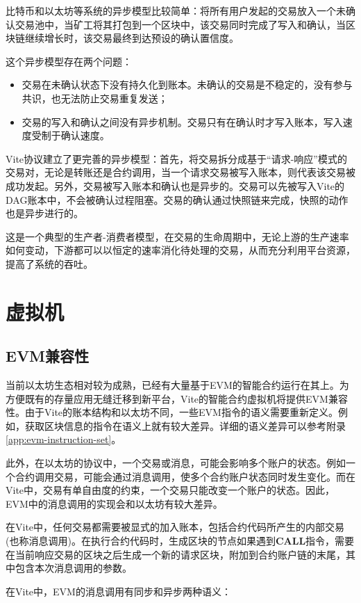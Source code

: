 \documentclass[UTF8,nofonts]{ctexart}
\begin{document}
\begin{multicols}{2}
比特币和以太坊等系统的异步模型比较简单：将所有用户发起的交易放入一个未确认交易池中，当矿工将其打包到一个区块中，该交易同时完成了写入和确认，当区块链继续增长时，该交易最终到达预设的确认置信度。

这个异步模型存在两个问题：
\begin{itemize}
	\item 交易在未确认状态下没有持久化到账本。未确认的交易是不稳定的，没有参与共识，也无法防止交易重复发送；
	\item 交易的写入和确认之间没有异步机制。交易只有在确认时才写入账本，写入速度受制于确认速度。
\end{itemize}

Vite协议建立了更完善的异步模型：首先，将交易拆分成基于“请求-响应”模式的交易对，无论是转账还是合约调用，当一个请求交易被写入账本，则代表该交易被成功发起。另外，交易被写入账本和确认也是异步的。交易可以先被写入Vite的DAG账本中，不会被确认过程阻塞。交易的确认通过快照链来完成，快照的动作也是异步进行的。

这是一个典型的生产者-消费者模型，在交易的生命周期中，无论上游的生产速率如何变动，下游都可以以恒定的速率消化待处理的交易，从而充分利用平台资源，提高了系统的吞吐。

\section{虚拟机}
\subsection{EVM兼容性}
当前以太坊生态相对较为成熟，已经有大量基于EVM的智能合约运行在其上。为方便既有的存量应用无缝迁移到新平台，Vite的智能合约虚拟机将提供EVM兼容性。由于Vite的账本结构和以太坊不同，一些EVM指令的语义需要重新定义。例如，获取区块信息的指令在语义上就有较大差异。详细的语义差异可以参考附录\ref{app:evm-instruction-set}。

此外，在以太坊的协议中，一个交易或消息，可能会影响多个账户的状态。例如一个合约调用交易，可能会通过消息调用，使多个合约账户状态同时发生变化。而在Vite中，交易有单自由度的约束，一个交易只能改变一个账户的状态。因此，EVM中的消息调用的实现会和以太坊有较大差异。

在Vite中，任何交易都需要被显式的加入账本，包括合约代码所产生的内部交易(也称消息调用)。在执行合约代码时，生成区块的节点如果遇到\textbf{CALL}指令，需要在当前响应交易的区块之后生成一个新的请求区块，附加到合约账户链的末尾，其中包含本次消息调用的参数。

在Vite中，EVM的消息调用有同步和异步两种语义：


\end{multicols}
\end{document}
